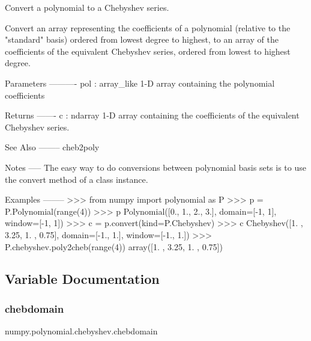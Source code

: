 \begin{DoxyVerb}Convert a polynomial to a Chebyshev series.

Convert an array representing the coefficients of a polynomial (relative
to the "standard" basis) ordered from lowest degree to highest, to an
array of the coefficients of the equivalent Chebyshev series, ordered
from lowest to highest degree.

Parameters
----------
pol : array_like
    1-D array containing the polynomial coefficients

Returns
-------
c : ndarray
    1-D array containing the coefficients of the equivalent Chebyshev
    series.

See Also
--------
cheb2poly

Notes
-----
The easy way to do conversions between polynomial basis sets
is to use the convert method of a class instance.

Examples
--------
>>> from numpy import polynomial as P
>>> p = P.Polynomial(range(4))
>>> p
Polynomial([0., 1., 2., 3.], domain=[-1,  1], window=[-1,  1])
>>> c = p.convert(kind=P.Chebyshev)
>>> c
Chebyshev([1.  , 3.25, 1.  , 0.75], domain=[-1.,  1.], window=[-1.,  1.])
>>> P.chebyshev.poly2cheb(range(4))
array([1.  , 3.25, 1.  , 0.75])\end{DoxyVerb}
 

\subsection{Variable Documentation}
\mbox{\label{namespacenumpy_1_1polynomial_1_1chebyshev_a240386220c18d9c518e66890b72aba24}} 
\subsubsection{\texorpdfstring{chebdomain}{chebdomain}}
{\footnotesize\ttfamily numpy.\+polynomial.\+chebyshev.\+chebdomain}

\mbox{\label{namespacenumpy_1_1polynomial_1_1chebyshev_a5101550f57e64c08406bf41524809413}} 

